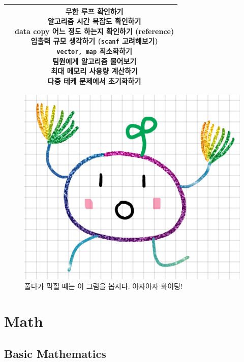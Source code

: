 \documentclass[landscape, 8pt, a4paper, oneside, twocolumn]{extarticle}
\begin{document}
\begin{table}[H]
\begin{tabular}{|c|c|}
{        } &
        \makecell{
            \textbf{무한 루프 확인하기} \\
            \textbf{알고리즘 시간 복잡도 확인하기} \\
            data copy 어느 정도 하는지 확인하기 (reference) \\
            입출력 규모 생각하기 (\texttt{scanf} 고려해보기) \\
            \texttt{vector, map} 최소화하기 \\
            팀원에게 알고리즘 물어보기 \\
            최대 메모리 사용량 계산하기 \\
            다중 테케 문제에서 초기화하기 \\ 
        } \\ \hline
        
    \end{tabular}
\end{table}

\begin{figure}[h]
    \centering
    \includegraphics[height=0.2\textheight]{./cheer_potato.png}
    \caption{풀다가 막힐 때는 이 그림을 봅시다. 아자아자 화이팅!}
\end{figure}

\newpage
\section{Math}

\subsection{Basic Mathematics}
\end{document}
